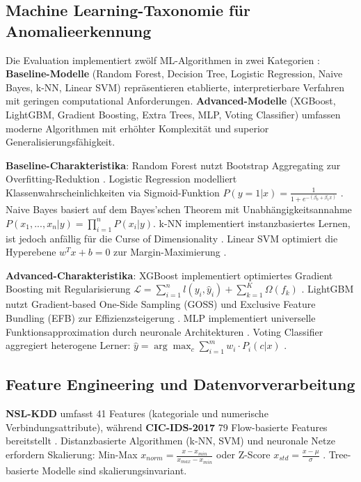 \documentclass[11pt,a4paper]{article}
\begin{document}
    \subsection{Machine Learning-Taxonomie für Anomalieerkennung}

    Die Evaluation implementiert zwölf ML-Algorithmen in zwei Kategorien \parencite{Vinayakumar2019}: \textbf{Baseline-Modelle} (Random Forest, Decision Tree, Logistic Regression, Naive Bayes, k-NN, Linear SVM) repräsentieren etablierte, interpretierbare Verfahren mit geringen computational Anforderungen. \textbf{Advanced-Modelle} (XGBoost, LightGBM, Gradient Boosting, Extra Trees, MLP, Voting Classifier) umfassen moderne Algorithmen mit erhöhter Komplexität und superior Generalisierungsfähigkeit.

    \textbf{Baseline-Charakteristika}: Random Forest nutzt Bootstrap Aggregating zur Overfitting-Reduktion \parencite{Hastie2009}. Logistic Regression modelliert Klassenwahrscheinlichkeiten via Sigmoid-Funktion $P(y=1|x) = \frac{1}{1+e^{-(\beta_0 + \beta_1 x)}}$ \parencite{Bishop2006}. Naive Bayes basiert auf dem Bayes'schen Theorem mit Unabhängigkeitsannahme $P(x_1,...,x_n|y) = \prod_{i=1}^{n} P(x_i|y)$. k-NN implementiert instanzbasiertes Lernen, ist jedoch anfällig für die Curse of Dimensionality \parencite{Hastie2009}. Linear SVM optimiert die Hyperebene $w^T x + b = 0$ zur Margin-Maximierung \parencite{Platt1999}.

    \textbf{Advanced-Charakteristika}: XGBoost implementiert optimiertes Gradient Boosting mit Regularisierung $\mathcal{L} = \sum_{i=1}^{n} l(y_i, \hat{y}_i) + \sum_{k=1}^{K} \Omega(f_k)$ \parencite{Hastie2009}. LightGBM nutzt Gradient-based One-Side Sampling (GOSS) und Exclusive Feature Bundling (EFB) zur Effizienzsteigerung \parencite{Zhou2020}. MLP implementiert universelle Funktionsapproximation durch neuronale Architekturen \parencite{Goodfellow2016}. Voting Classifier aggregiert heterogene Lerner: $\hat{y} = \arg\max_c \sum_{i=1}^{m} w_i \cdot P_i(c|x)$ \parencite{Hastie2009}.

    \subsection{Feature Engineering und Datenvorverarbeitung}

    \textbf{NSL-KDD} umfasst 41 Features (kategoriale und numerische Verbindungsattribute), während \textbf{CIC-IDS-2017} 79 Flow-basierte Features bereitstellt \parencite{Gharib2016,Sharafaldin2018}. Distanzbasierte Algorithmen (k-NN, SVM) und neuronale Netze erfordern Skalierung: Min-Max $x_{norm} = \frac{x - x_{min}}{x_{max} - x_{min}}$ oder Z-Score $x_{std} = \frac{x - \mu}{\sigma}$ \parencite{Bishop2006}. Tree-basierte Modelle sind skalierungsinvariant.
\end{document}
